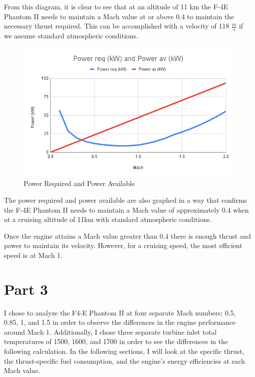 \documentclass[12pt]{report}
\begin{document}
From this diagram, it is clear to see that at an altitude of 11 km the F-4E Phantom II needs to maintain a Mach value at or above 0.4 to maintain the necessary thrust required. This can be accomplished with a velocity of 118 $\frac{m}{s}$ if we assume standard atmospheric conditions.

\begin{figure}[H]
    \centering
    \includegraphics[width=14.5cm]{Power req (kW) and Power av (kW).png}
    \caption{Power Required and Power Available}
    \label{fig:enter-Power Required and Power Available}
\end{figure}

The power required and power available are also graphed in a way that confirms the F-4E Phantom II needs to maintain a Mach value of approximately 0.4 when at a cruising altitude of 11km with standard atmospheric conditions.

Once the engine attains a Mach value greater than 0.4 there is enough thrust and power to maintain its velocity. However, for a cruising speed, the most efficient speed is at Mach 1.

\chapter{Part 3}
I chose to analyze the F4-E Phantom II at four separate Mach numbers; 0.5, 0.85, 1, and 1.5 in order to observe the differences in the engine performance around Mach 1. Additionally, I chose three separate turbine inlet total temperatures of 1500, 1600, and 1700 in order to see the differences in the following calculation. In the following sections, I will look at the specific thrust, the thrust-specific fuel consumption, and the engine's energy efficiencies at each Mach value.
\end{document}
